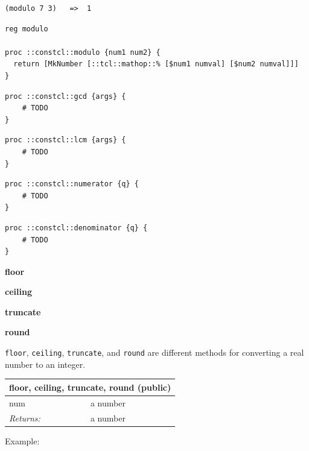 \documentclass[twoside,9pt]{report}
\begin{document}
\noindent\makebox[\linewidth]{\rule{\linewidth}{0.4pt}}
\begin{lstlisting}
(modulo 7 3)   =>  1
\end{lstlisting}
\noindent\makebox[\linewidth]{\rule{\linewidth}{0.4pt}}
\noindent\makebox[\linewidth]{\rule{\linewidth}{0.4pt}}
\begin{lstlisting}
reg modulo
 
proc ::constcl::modulo {num1 num2} {
  return [MkNumber [::tcl::mathop::% [$num1 numval] [$num2 numval]]]
}
\end{lstlisting}
\noindent\makebox[\linewidth]{\rule{\linewidth}{0.4pt}}
\noindent\makebox[\linewidth]{\rule{\linewidth}{0.4pt}}
\begin{lstlisting}
proc ::constcl::gcd {args} {
    # TODO
}
\end{lstlisting}
\noindent\makebox[\linewidth]{\rule{\linewidth}{0.4pt}}
\noindent\makebox[\linewidth]{\rule{\linewidth}{0.4pt}}
\begin{lstlisting}
proc ::constcl::lcm {args} {
    # TODO
}
\end{lstlisting}
\noindent\makebox[\linewidth]{\rule{\linewidth}{0.4pt}}
\noindent\makebox[\linewidth]{\rule{\linewidth}{0.4pt}}
\begin{lstlisting}
proc ::constcl::numerator {q} {
    # TODO
}
\end{lstlisting}
\noindent\makebox[\linewidth]{\rule{\linewidth}{0.4pt}}
\noindent\makebox[\linewidth]{\rule{\linewidth}{0.4pt}}
\begin{lstlisting}
proc ::constcl::denominator {q} {
    # TODO
}
\end{lstlisting}
\noindent\makebox[\linewidth]{\rule{\linewidth}{0.4pt}}

\textbf{floor}


\textbf{ceiling}


\textbf{truncate}


\textbf{round}


\texttt{floor}, \texttt{ceiling}, \texttt{truncate}, and \texttt{round} are different methods for converting a real number to an integer.

\begin{tabular}{ |l l| }
\hline
\multicolumn{2}{|l|}{floor, ceiling, truncate, round (public)} \\
\hline
num & a number \\
\textit{Returns:} & a number \\
\hline
\end{tabular}


Example:
\end{document}
